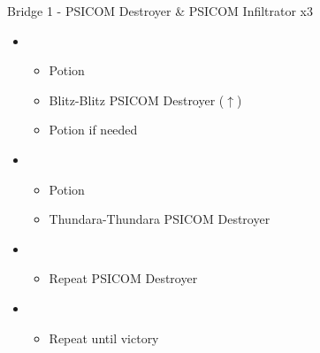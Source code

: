 \begin{paracol}{2}
	\begin{battle}{Bridge 1 - PSICOM Destroyer \& PSICOM Infiltrator x3}
		\begin{itemize}
			\item \first
			      \begin{itemize}
				      \item Potion
				      \item Blitz-Blitz PSICOM Destroyer ($\uparrow$)
				      \item Potion if needed
			      \end{itemize}
			\item \fourth
			      \begin{itemize}
				      \item Potion
				      \item Thundara-Thundara PSICOM Destroyer
			      \end{itemize}
			\item \first
			      \begin{itemize}
				      \item Repeat PSICOM Destroyer
			      \end{itemize}
			\item \sixth
			      \begin{itemize}
				      \item Repeat until victory
			      \end{itemize}
		\end{itemize}
		  
	\end{battle}


\end{paracol}
